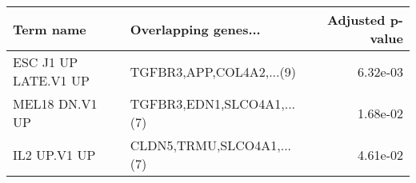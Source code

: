 \begin{tabular}{llr}
\toprule
           Term name &       Overlapping genes... &  Adjusted p-value \\
\midrule
ESC J1 UP LATE.V1 UP &   TGFBR3,APP,COL4A2,...(9) &          6.32e-03 \\
      MEL18 DN.V1 UP & TGFBR3,EDN1,SLCO4A1,...(7) &          1.68e-02 \\
        IL2 UP.V1 UP &  CLDN5,TRMU,SLCO4A1,...(7) &          4.61e-02 \\
\bottomrule
\end{tabular}
